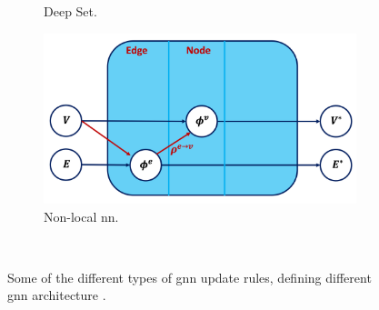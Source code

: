 \begin{figure}[h!]
\begin{subfigure}[b]{0.49\textwidth}
        \caption{Deep Set.} 
        \label{fig:deepSetFig}
    \end{subfigure}
    \hfill
    \begin{subfigure}[b]{0.49\textwidth}
        \centering
        \includegraphics[scale=0.43]{Images/ML/nlnn.png}
        \caption{Non-local \gls{nn}.} 
        \label{fig:pullsFTAGmp}
    \end{subfigure}\\
    \caption{Some of the different types of \gls{gnn} update rules, defining different \gls{gnn} architecture \cite{graphInductiveBias}.}
    \label{fig:diverseGNN}
\end{figure} 

